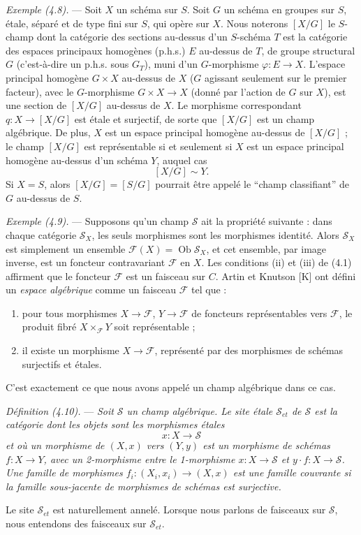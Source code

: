 \documentclass[10pt]{article}
\begin{document}
\medskip
\noindent\emph{Exemple (4.8).} --- Soit $X$ un schéma sur $S$. Soit $G$ un schéma en groupes sur $S$, étale, séparé et de type fini sur $S$, qui opère sur $X$. Nous noterons $[X/G]$ le $S$-champ dont la catégorie des sections au-dessus d'un $S$-schéma $T$ est la catégorie des espaces principaux homogènes (p.h.s.) $E$ au-dessus de $T$, de groupe structural $G$ (c'est-à-dire un p.h.s. sous $G_T$), muni d'un $G$-morphisme $\varphi:E\to X$. L'espace principal homogène $G\times X$ au-dessus de $X$ ($G$ agissant seulement sur le premier facteur), avec le $G$-morphisme $G\times X\to X$ (donné par l'action de $G$ sur $X$), est une section de $[X/G]$ au-dessus de $X$. Le morphisme correspondant $q:X\to[X/G]$ est étale et surjectif, de sorte que $[X/G]$ est un champ algébrique. De plus, $X$ est un espace principal homogène au-dessus de $[X/G]$ ; le champ $[X/G]$ est représentable si et seulement si $X$ est un espace principal homogène au-dessus d'un schéma $Y$, auquel cas
\[
[X/G]\sim Y.
\]
Si $X=S$, alors $[X/G]=[S/G]$ pourrait être appelé le ``champ classifiant'' de $G$ au-dessus de $S$.

\medskip
\noindent\emph{Exemple (4.9).} --- Supposons qu'un champ $\mathscr S$ ait la propriété suivante : dans chaque catégorie $\mathscr S_X$, les seuls morphismes sont les morphismes identité. Alors $\mathscr S_X$ est simplement un ensemble $\mathscr F(X)=\operatorname{Ob}\mathscr S_X$, et cet ensemble, par image inverse, est un foncteur contravariant $\mathscr F$ en $X$. Les conditions (ii) et (iii) de (4.1) affirment que le foncteur $\mathscr F$ est un faisceau sur $C$. Artin et Knutson [K] ont défini un \emph{espace algébrique} comme un faisceau $\mathscr F$ tel que :
\begin{enumerate}[label=(\roman*)]
\item pour tous morphismes $X\to\mathscr F$, $Y\to\mathscr F$ de foncteurs représentables vers $\mathscr F$, le produit fibré $X\times_{\mathscr F}Y$ soit représentable ;
\item il existe un morphisme $X\to\mathscr F$, représenté par des morphismes de schémas surjectifs et étales.
\end{enumerate}
C'est exactement ce que nous avons appelé un champ algébrique dans ce cas.

\medskip
\noindent\emph{Définition (4.10).} --- \emph{Soit $\mathscr S$ un champ algébrique. Le site étale $\mathscr S_{et}$ de $\mathscr S$ est la catégorie dont les objets sont les morphismes étales}
\[
x:X\to\mathscr S
\]
\emph{et où un morphisme de $(X,x)$ vers $(Y,y)$ est un morphisme de schémas $f:X\to Y$, avec un 2-morphisme entre le 1-morphisme $x:X\to\mathscr S$ et $y\cdot f:X\to\mathscr S$. Une famille de morphismes $f_i:(X_i,x_i)\to(X,x)$ est une famille couvrante si la famille sous-jacente de morphismes de schémas est surjective.}

Le site $\mathscr S_{et}$ est naturellement annelé. Lorsque nous parlons de faisceaux sur $\mathscr S$, nous entendons des faisceaux sur $\mathscr S_{et}$.
\end{document}
